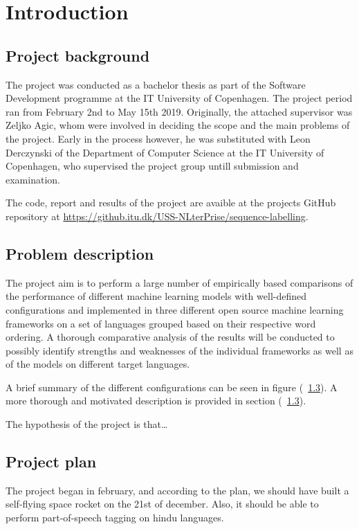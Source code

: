
\section{Introduction}

\subsection{Project background}

The project was conducted as a bachelor thesis as part of the Software
Development programme at the IT University of Copenhagen. The project period ran
from February 2nd to May 15th 2019. Originally, the attached supervisor was
Zeljko Agic, whom were involved in deciding the scope and the main problems of
the project. Early in the process however, he was substituted with Leon
Derczynski of the Department of Computer Science at the IT University of
Copenhagen, who supervised the project group untill submission and examination.

The code, report and results of the project are avaible at the projects GitHub
repository at \url{https://github.itu.dk/USS-NLterPrise/sequence-labelling}.


\subsection{Problem description}

The project aim is to perform a large number of empirically based comparisons of
the performance of different machine learning models with well-defined
configurations and implemented in three different open source machine learning
frameworks on a set of languages grouped based on their respective word
ordering. A thorough comparative analysis of the results will be conducted to
possibly identify strengths and weaknesses of the individual frameworks as well
as of the models on different target languages.

A brief summary of the different configurations can be seen in figure (~\ref{}). A
more thorough and motivated description is provided in section (~\ref{}).

The hypothesis of the project is that\ldots


\subsection{Project plan}

The project began in february, and according to the plan, we should have built a
self-flying space rocket on the 21st of december. Also, it should be able to
perform part-of-speech tagging on hindu languages.

\pagebreak
